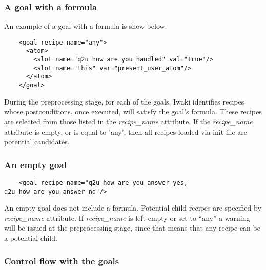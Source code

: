 \subsubsection{A goal with a formula}

An example of a goal with a formula is show below:

\lstset{language=XML}
\begin{lstlisting}
    <goal recipe_name="any">
      <atom>
        <slot name="q2u_how_are_you_handled" val="true"/>
        <slot name="this" var="present_user_atom"/>
      </atom>
    </goal>
\end{lstlisting}


During the preprocessing stage, for each of the goals, Iwaki identifies recipes whose postconditions, once executed, will satisfy the goal's formula.  These recipes are selected from those listed in the \textsl{recipe\_name} attribute. If the \textsl{recipe\_name}  attribute is empty, or is equal to 'any', then all recipes loaded via init file are potential candidates. 
 
\subsubsection{An empty goal}

\lstset{language=XML}
\begin{lstlisting}
    <goal recipe_name="q2u_how_are_you_answer_yes, q2u_how_are_you_answer_no"/>
\end{lstlisting}

An empty goal does not include a formula. Potential child recipes are specified by \textsl{recipe\_name} attribute. If \textsl{recipe\_name} is left empty or set to ``any'' a warning will be issued at the preprocessing stage, since that means that any recipe can be a potential child.

\subsubsection{Control flow with the goals}

